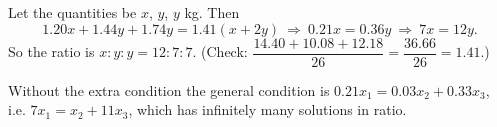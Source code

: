 Let the quantities be $x$, $y$, $y$ kg. Then
\[1.20x+1.44y+1.74y=1.41(x+2y)\ \Longrightarrow\ 0.21x=0.36y\ \Longrightarrow\ 7x=12y.\]
So the ratio is $x:y:y=\boxed{12:7:7}$. (Check: $\dfrac{14.40+10.08+12.18}{26}=\dfrac{36.66}{26}=1.41$.)

Without the extra condition the general condition is $0.21x_1=0.03x_2+0.33x_3$, i.e. $7x_1=x_2+11x_3$, which has infinitely many solutions in ratio.
